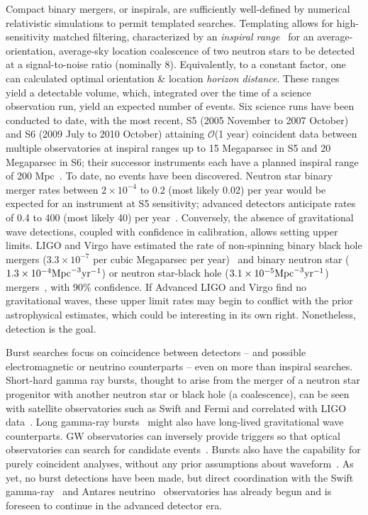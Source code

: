 Compact binary mergers, or inspirals, are sufficiently well-defined by numerical relativistic simulations to permit templated searches.
Templating allows for high-sensitivity matched filtering, characterized by an \textit{inspiral range}~\cite{FinnInspiral1993} for an average-orientation, average-sky location coalescence of two neutron stars to be detected at a signal-to-noise ratio (nominally 8).
Equivalently, to a constant factor, one can calculated optimal orientation \& location \textit{horizon distance}.
These ranges yield a detectable volume, which, integrated over the time of a science observation run, yield an expected number of events.
Six science runs have been conducted to date, with the most recent, S5 (2005 November to 2007 October) and S6 (2009 July to 2010 October) attaining $\mathcal{O}$(1 year) coincident data between multiple observatories at inspiral ranges up to 15 Megaparsec in S5 and 20 Megaparsec in S6; their successor instruments each have a planned inspiral range of 200 Mpc~\cite{HarryALIGO2010}.
To date, no events have been discovered.
Neutron star binary merger rates between $2\times 10^{-4}$ to 0.2 (most likely 0.02) per year would be expected for an instrument at S5 sensitivity; advanced detectors anticipate rates of 0.4 to 400 (most likely 40) per year~\cite{AbadieRates2010}.
Conversely, the absence of gravitational wave detections, coupled with confidence in calibration, allows setting upper limits.
LIGO and Virgo have estimated the rate of non-spinning binary black hole mergers ($3.3\times10^{-7}$ per cubic Megaparsec per year)~\cite{AasiBBH2013} and binary neutron star ($1.3\times10^{-4} \textup{Mpc}^{-3} \textup{yr}^{-1}$) or neutron star-black hole ($3.1\times10^{-5} \textup{Mpc}^{-3} \textup{yr}^{-1}$) mergers~\cite{AbadieCBC2012}, with 90\% confidence.
If Advanced LIGO and Virgo find no gravitational waves, these upper limit rates may begin to conflict with the prior astrophysical estimates, which could be interesting in its own right.
Nonetheless, detection is the goal.

Burst searches focus on coincidence between detectors -- and possible electromagnetic or neutrino counterparts -- even on more than inspiral searches.
Short-hard gamma ray bursts, thought to arise from the merger of a neutron star progenitor with another neutron star or black hole (a coalescence), can be seen with satellite observatories such as Swift and Fermi and correlated with LIGO data~\cite{AbadieGRB2012}.
Long gamma-ray bursts~\cite{AasiGRB2013} might also have long-lived gravitational wave counterparts.
GW observatories can inversely provide triggers so that optical observatories can search for candidate events~\cite{AasiOpticalCounterpart2014}.
Bursts also have the capability for purely coincident analyses, without any prior assumptions about waveform~\cite{LIGOBurst2012}.
As yet, no burst detections have been made, but direct coordination with the Swift gamma-ray~\cite{Swift2012} and Antares neutrino~\cite{Antares2013} observatories has already begun and is foreseen to continue in the advanced detector era.


